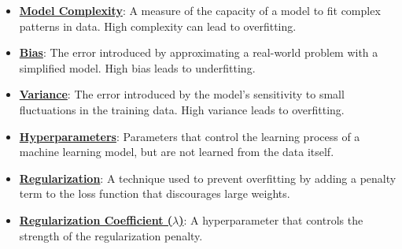 \documentclass{article}%
\begin{document}
\begin{itemize}[leftmargin=*]
\item \href{https://purdue.brightspace.com/d2l/common/assets/pdfjs-d2l-dist/1.0.14-legacy/web/viewer.html?file=%2Fcontent%2Fenforced%2F1095467-wl.202510.CS.24300.001%2F10L1-CrossValidation.pdf%3Fou%3D1095467&lang=en-us&container=d2l-fileviewer-rendered-pdf&fullscreen=d2l-fileviewer-rendered-pdf-dialog&height=667#page=13}{\textbf{Model Complexity}}: A measure of the capacity of a model to fit complex patterns in data. High complexity can lead to overfitting.%
\item \href{https://purdue.brightspace.com/d2l/common/assets/pdfjs-d2l-dist/1.0.14-legacy/web/viewer.html?file=%2Fcontent%2Fenforced%2F1095467-wl.202510.CS.24300.001%2F10L1-CrossValidation.pdf%3Fou%3D1095467&lang=en-us&container=d2l-fileviewer-rendered-pdf&fullscreen=d2l-fileviewer-rendered-pdf-dialog&height=667#page=4}{\textbf{Bias}}: The error introduced by approximating a real-world problem with a simplified model. High bias leads to underfitting.%
\item \href{https://purdue.brightspace.com/d2l/common/assets/pdfjs-d2l-dist/1.0.14-legacy/web/viewer.html?file=%2Fcontent%2Fenforced%2F1095467-wl.202510.CS.24300.001%2F10L1-CrossValidation.pdf%3Fou%3D1095467&lang=en-us&container=d2l-fileviewer-rendered-pdf&fullscreen=d2l-fileviewer-rendered-pdf-dialog&height=667#page=4}{\textbf{Variance}}: The error introduced by the model's sensitivity to small fluctuations in the training data. High variance leads to overfitting.%
\item \href{https://purdue.brightspace.com/d2l/common/assets/pdfjs-d2l-dist/1.0.14-legacy/web/viewer.html?file=%2Fcontent%2Fenforced%2F1095467-wl.202510.CS.24300.001%2F10L1-CrossValidation.pdf%3Fou%3D1095467&lang=en-us&container=d2l-fileviewer-rendered-pdf&fullscreen=d2l-fileviewer-rendered-pdf-dialog&height=667#page=10}{\textbf{Hyperparameters}}: Parameters that control the learning process of a machine learning model, but are not learned from the data itself.%
\item \href{https://purdue.brightspace.com/d2l/common/assets/pdfjs-d2l-dist/1.0.14-legacy/web/viewer.html?file=%2Fcontent%2Fenforced%2F1095467-wl.202510.CS.24300.001%2F10L1-CrossValidation.pdf%3Fou%3D1095467&lang=en-us&container=d2l-fileviewer-rendered-pdf&fullscreen=d2l-fileviewer-rendered-pdf-dialog&height=667#page=17}{\textbf{Regularization}}: A technique used to prevent overfitting by adding a penalty term to the loss function that discourages large weights.%
\item \href{https://purdue.brightspace.com/d2l/common/assets/pdfjs-d2l-dist/1.0.14-legacy/web/viewer.html?file=%2Fcontent%2Fenforced%2F1095467-wl.202510.CS.24300.001%2F10L1-CrossValidation.pdf%3Fou%3D1095467&lang=en-us&container=d2l-fileviewer-rendered-pdf&fullscreen=d2l-fileviewer-rendered-pdf-dialog&height=667#page=17}{\textbf{Regularization Coefficient ($\lambda$)}}: A hyperparameter that controls the strength of the regularization penalty.%

\end{itemize}
\end{document}
